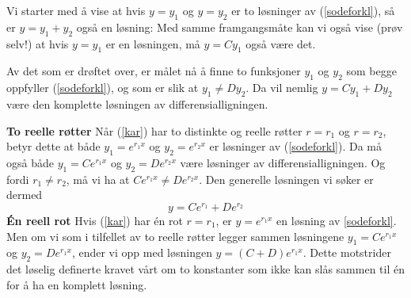 Vi starter med å vise at hvis $ {y=y_1} $ og $ {y=y_2} $ er to løsninger av (\ref{sodeforkl}), så er $ {y=y_1 + y_2 }$ også en løsning:
Med samme framgangsmåte kan vi også vise (prøv selv!) at hvis $ {y=y_1} $ er en løsningen, må $ y=Cy_1 $ også være det. \vsk

Av det som er drøftet over, er målet nå å finne to funksjoner $ y_1 $ og $ y_2 $ som begge oppfyller (\ref{sodeforkl}), og som er slik at $ {y_1\neq Dy_2} $. Da vil nemlig $ {y=Cy_1+Dy_2} $ være den komplette løsningen av differensialligningen.\vsk

\textbf{To reelle røtter}\bs
Når (\ref{kar}) har to distinkte og reelle røtter $ {r=r_1} $ og $ {r=r_2} $, betyr dette at både $ {y_1=e^{r_1x}} $ og $ {y_2=e^{r_2x} }$ er løsninger av (\ref{sodeforkl}). Da må også både $ {y_1=Ce^{r_1x}} $ og $ {y_2=De^{r_2x}}$ være løsninger av differensialligningen. Og fordi $ r_1\neq r_2 $, må vi ha at $ Ce^{r_1 x}\neq De^{r_2 x} $. Den generelle løsningen vi søker er dermed
\[ y=Ce^{r_1}+De^{r_2}   \]
\newpage
\textbf{Én reell rot}\bs
Hvis (\ref{kar}) har én rot $ {r=r_1} $, er $ {y=e^{r_1x}} $ en løsning av \eqref{sodeforkl}. Men om vi som i tilfellet av to reelle røtter legger sammen løsningene ${y_1 =Ce^{r_1x}} $ og ${y_2= De^{r_1x}} $, ender vi opp med løsningen $ {y=(C+D)e^{r_1 x} }$. Dette motstrider det løselig definerte kravet vårt om to konstanter som ikke kan slås sammen til én for å ha en komplett løsning.\vsk


